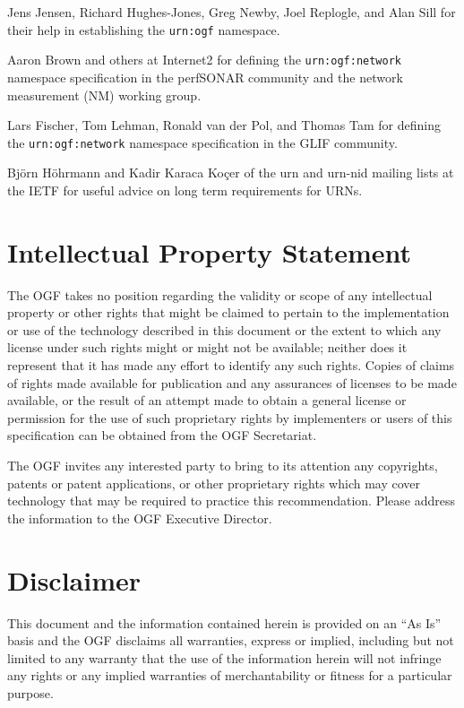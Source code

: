 \documentclass[12pt]{article}  %
\begin{document}
Jens Jensen, Richard Hughes-Jones, Greg Newby, Joel Replogle, and Alan Sill for their help in establishing the \texttt{urn:ogf} namespace.

Aaron Brown and others at Internet2 for defining the \texttt{urn:ogf:network} namespace specification in the perfSONAR community and the network measurement (NM) working group.

Lars Fischer, Tom Lehman, Ronald van der Pol, and Thomas Tam for defining the \texttt{urn:ogf:network} namespace specification in the GLIF community.

Björn Höhrmann and Kadir Karaca Koçer of the urn and urn-nid mailing lists at the IETF for useful advice on long term requirements for URNs.

\section*{Intellectual Property Statement}

The OGF takes no position regarding the validity or scope of any intellectual
property or other rights that might be claimed to pertain to the
implementation or use of the technology described in this document or the
extent to which any license under such rights might or might not be
available; neither does it represent that it has made any effort to identify
any such rights. Copies of claims of rights made available for publication
and any assurances of licenses to be made available, or the result of an
attempt made to obtain a general license or permission for the use of such
proprietary rights by implementers or users of this specification can be
obtained from the OGF Secretariat.

The OGF invites any interested party to bring to its attention any
copyrights, patents or patent applications, or other proprietary rights which
may cover technology that may be required to practice this recommendation.
Please address the information to the OGF Executive Director.

\section*{Disclaimer}

This document and the information contained herein is provided on an ``As
Is'' basis and the OGF disclaims all warranties, express or implied,
including but not limited to any warranty that the use of the information
herein will not infringe any rights or any implied warranties of
merchantability or fitness for a particular purpose.
\end{document}
